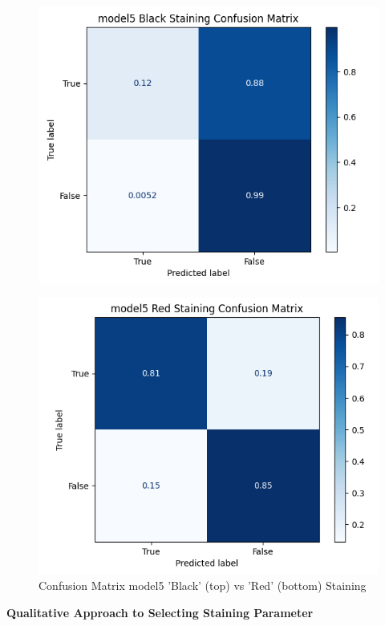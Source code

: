 \begin{figure}[!htb]
    \centering
    \includegraphics[scale=0.6]{figures/m5_black_cm.png} 
    \label{fig:x Confusion Matrix mode5 Black Staining}
    
    \centering
    \includegraphics[scale=0.6]{figures/m5_red_cm.png} 
    \caption{Confusion Matrix model5 'Black' (top) vs 'Red' (bottom) Staining}
    \label{fig:x Confusion Matrix mode5 Red Staining}
\end{figure}

\newpage

\textbf{Qualitative Approach to Selecting Staining Parameter}

